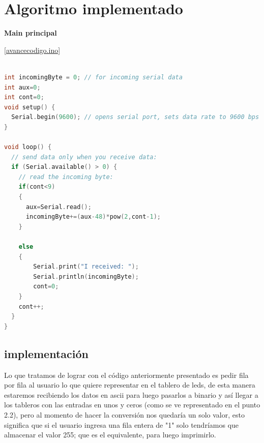 \documentclass{article}
\begin{document}
\newpage

\section{Algoritmo implementado} \label{codigo}
\textbf{Main principal}

\ref{avancecodigo.ino}
\begin{lstlisting}[language=C++, label=avancecodigo.ino]

int incomingByte = 0; // for incoming serial data
int aux=0;
int cont=0;
void setup() {
  Serial.begin(9600); // opens serial port, sets data rate to 9600 bps
}

void loop() {
  // send data only when you receive data:
  if (Serial.available() > 0) {
    // read the incoming byte:
    if(cont<9)
    {
      aux=Serial.read();
      incomingByte+=(aux-48)*pow(2,cont-1);
    }

    else
    {
    	Serial.print("I received: ");
    	Serial.println(incomingByte);
      	cont=0;
    }
    cont++;
  }
}

 \end{lstlisting}
 
 
\subsection{implementación}
Lo que tratamos de lograr con el código anteriormente presentado es pedir fila por fila al usuario lo que quiere representar en el tablero de leds, de esta manera estaremos recibiendo los datos en ascii para luego pasarlos a  binario y así llegar a los tableros con las entradas en unos y ceros (como se ve representado en el punto 2.2), pero al momento de hacer la conversión nos quedaría un solo valor, esto significa que si el usuario ingresa una fila entera de "1" solo tendríamos que almacenar el valor 255; que es el equivalente, para luego imprimirlo.





\newpage
\end{document}
